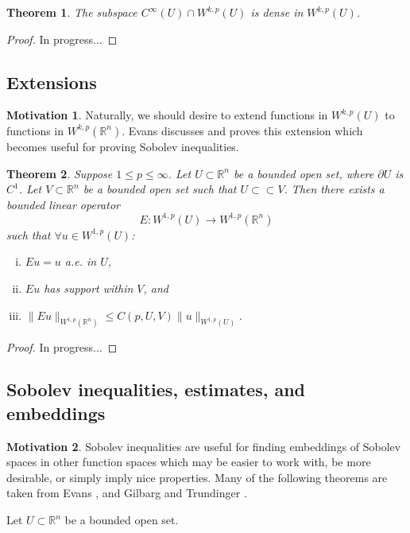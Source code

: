 \documentclass[11pt]{article}
\newtheorem{theorem}{Theorem}
\theoremstyle{definition}
\newtheorem*{motivation}{Motivation}
\begin{document}
\begin{theorem}
	The subspace $C^{\infty}(U) \cap W^{k,p}(U)$ is dense in $W^{k,p}(U)$.
\end{theorem}
\begin{proof}
In progress...
\end{proof}

\newpage

\subsection{Extensions}
\begin{motivation}
Naturally, we should desire to extend functions in $W^{k,p}(U)$ to functions in $W^{k,p}(\mathbb{R}^n)$.
Evans \cite{evans1998partial} discusses and proves this extension which becomes useful for proving Sobolev inequalities.
\end{motivation}

\begin{theorem}
	Suppose $1 \leq p \leq \infty$.
Let $U \subset \mathbb{R}^n$ be a bounded open set, where $\partial U$ is $C^1$.
Let $V \subset \mathbb{R}^n$ be a bounded open set such that $U \subset\subset V$.
Then there exists a bounded linear operator
	\[E: W^{1,p}(U) \rightarrow W^{1,p}(\mathbb{R}^n)\]
such that $\forall u \in W^{1,p}(U)$:
	\begin{enumerate}[(i)]
		\item $Eu = u$ a.e. in $U$,
		\item $Eu$ has support within $V$, and
		\item $\|Eu\|_{W^{1,p}(\mathbb{R}^n)} \leq C(p,U,V)\|u\|_{W^{1,p}(U)}.$
	\end{enumerate}
\end{theorem}
\begin{proof}
In progress...
\end{proof}

\newpage

\subsection{Sobolev inequalities, estimates, and embeddings}
\begin{motivation}
Sobolev inequalities are useful for finding embeddings of Sobolev spaces in other function spaces which may be easier to work with, be more desirable,
or simply imply nice properties. Many of the following theorems are taken from Evans \cite{evans1998partial}, and Gilbarg and Trundinger \cite{gilbarg2001elliptic}.
\end{motivation}
Let $U \subset \mathbb{R}^n$ be a bounded open set.
\end{document}
